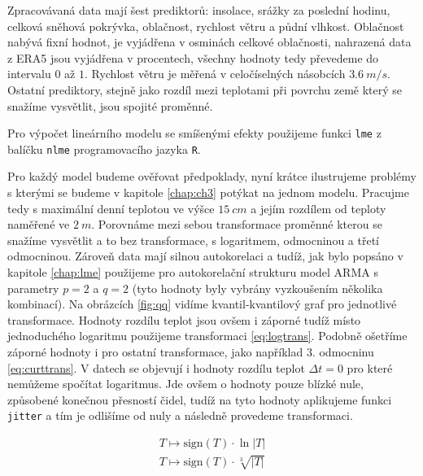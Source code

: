 Zpracovávaná data mají šest prediktorů: insolace, srážky za poslední hodinu, celková sněhová pokrývka, oblačnost, rychlost větru a půdní vlhkost. Oblačnost nabývá fixní hodnot, je vyjádřena v osminách celkové oblačnosti, nahrazená data z ERA5 jsou vyjádřena v procentech, všechny hodnoty tedy převedeme do intervalu $0$ až $1$. Rychlost větru je měřená v celočíselných násobcích $\SI{3.6}{m/s}$. Ostatní prediktory, stejně jako rozdíl mezi teplotami při povrchu země který se snažíme vysvětlit, jsou spojité proměnné. 

Pro výpočet lineárního modelu se smíšenými efekty použijeme funkci \texttt{lme} z balíčku \texttt{nlme} programovacího jazyka \texttt{R}.

Pro každý model budeme ověřovat předpoklady, nyní krátce ilustrujeme problémy s kterými se budeme v kapitole \ref{chap:ch3} potýkat na jednom modelu. Pracujme tedy s maximální denní teplotou ve výšce $\SI{15}{cm}$ a jejím rozdílem od teploty naměřené ve $\SI{2}{m}$. Porovnáme mezi sebou transformace proměnné kterou se snažíme vysvětlit a to bez transformace, s logaritmem, odmocninou a třetí odmocninou. Zároveň data mají silnou autokorelaci a tudíž, jak bylo popsáno v kapitole \ref{chap:lme} použijeme pro autokorelační strukturu model ARMA s parametry $p=2$ a $q=2$ (tyto hodnoty byly vybrány vyzkoušením několika kombinací). Na obrázcích \ref{fig:qq} vidíme kvantil-kvantilový graf pro jednotlivé transformace. Hodnoty rozdílu teplot jsou ovšem i záporné tudíž místo jednoduchého logaritmu použijeme transformaci \eqref{eq:logtrans}. Podobně ošetříme záporné hodnoty i pro ostatní transformace, jako například 3. odmocninu \eqref{eq:curttrans}. V datech se objevují i hodnoty rozdílu teplot $\Delta t=0$ pro které nemůžeme spočítat logaritmus. Jde ovšem o hodnoty pouze blízké nule, způsobené konečnou přesností čidel, tudíž na tyto hodnoty aplikujeme funkci \texttt{jitter} a tím je odlišíme od nuly a následně provedeme transformaci.

\begin{gather*}
	T \mapsto \mathrm{sign}(T)\cdot \ln\left|T\right| \label{eq:logtrans}\\
	T \mapsto \mathrm{sign}(T)\cdot \sqrt[3]{\left|T\right|} \label{eq:curttrans}
\end{gather*}

